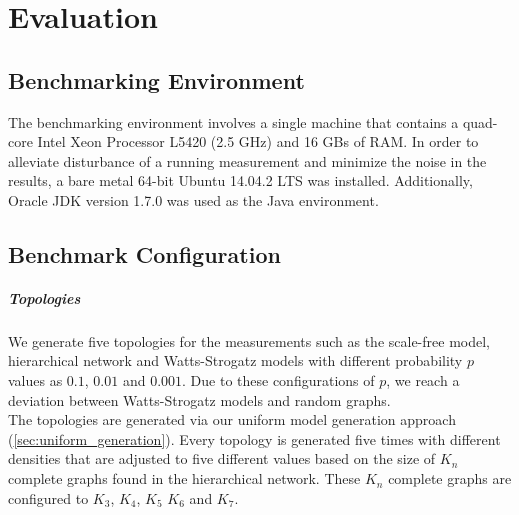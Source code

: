 
\chapter{Evaluation}



\section{Benchmarking Environment}

The benchmarking environment involves a single machine that contains a quad-core Intel Xeon Processor L5420 (2.5 GHz) and 16 GBs of RAM. In order to alleviate disturbance of a running measurement and minimize the noise in the results, a bare metal 64-bit Ubuntu 14.04.2 LTS was installed. Additionally, Oracle JDK version 1.7.0 was used as the Java environment.


\section{Benchmark Configuration}

\paragraph{Topologies}

We generate five topologies for the measurements such as the scale-free model, hierarchical network and Watts-Strogatz models with different probability $p$ values as $0.1$, $0.01$ and $0.001$. Due to these configurations of $p$, we reach a deviation between Watts-Strogatz models and random graphs.\\ The topologies are generated via our uniform model generation approach (\ref{sec:uniform_generation}).
Every topology is generated five times with different densities that are adjusted to five different values based on the size of $K_n$ complete graphs found in the hierarchical network. These $K_n$ complete graphs are configured to $K_3$, $K_4$, $K_5$ $K_6$ and $K_7$.

